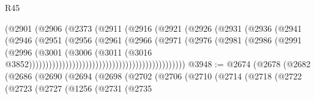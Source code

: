\begin{lexlean}{R45}
\begin{coremodule}
                                                (@2901
                                                  (@2906
                                                    (@2373
                                                      (@2911
                                                        (@2916
                                                          (@2921
                                                            (@2926
                                                              (@2931
                                                                (@2936
                                                                  (@2941
                                                                    (@2946
                                                                      (@2951
                                                                        (@2956
                                                                          (@2961
                                                                            (@2966
                                                                              (@2971
                                                                                (@2976
                                                                                  (@2981
                                                                                    (@2986
                                                                                      (@2991
                                                                                        (@2996
                                                                                          (@3001
                                                                                            (@3006
                                                                                              (@3011
                                                                                                (@3016
                                                                                                  @3852)))))))))))))))))))))))))))))))))))))))))))))))
@3948 := @2674
    (@2678
      (@2682
        (@2686
          (@2690
            (@2694
              (@2698
                (@2702
                  (@2706
                    (@2710
                      (@2714
                        (@2718
                          (@2722
                            (@2723
                              (@2727
                                (@1256
                                  (@2731
                                    (@2735

\end{coremodule}
\end{lexlean}
